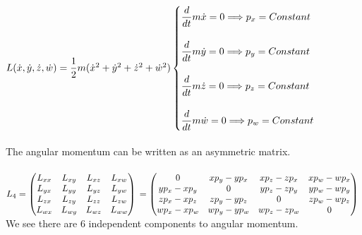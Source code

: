 \documentclass[fleqn]{article}
\begin{document}
\begin{enumerate}
\begin{itemize}
        \textcolor{hwColor}{
          $
          L(\dot{x}, \dot{y}, \dot{z}, \dot{w})=\dfrac{1}{2}m (\dot{x}^2+\dot{y}^2+\dot{z}^2+\dot{w}^2)
          \\
          \\
          \begin{cases}
            \dfrac{d}{dt}m \dot{x}=0 \Longrightarrow p_x=Constant
            \\
            \\
            \dfrac{d}{dt}m \dot{y}=0 \Longrightarrow p_y=Constant
            \\
            \\
            \dfrac{d}{dt}m \dot{z}=0 \Longrightarrow p_z=Constant
            \\
            \\
            \dfrac{d}{dt}m \dot{w}=0 \Longrightarrow p_w=Constant
          \end{cases}
          $
          \\
          \\
          The angular momentum can be written as an asymmetric matrix. 
          \\
          \\
          $
            L_4=\begin{pmatrix}
              L_{xx} & L_{xy} & L_{xz} & L_{xw} 
              \\
              L_{yx} & L_{yy} & L_{yz} & L_{yw}
              \\
              L_{zx} & L_{zy} & L_{zz} & L_{zw}
              \\
              L_{wx} & L_{wy} & L_{wz} & L_{ww}
            \end{pmatrix}
            \\
            \\
            \\
            \\
            =\begin{pmatrix}
              0 & xp_y-yp_x & xp_z-zp_x &  xp_w-wp_x
              \\
              yp_x-xp_y & 0 & yp_z-zp_y & yp_w-wp_y 
              \\
              zp_x-xp_z & zp_y-yp_z & 0 & zp_w-wp_z
              \\
              wp_x-xp_w & wp_y-yp_w & wp_z-zp_w & 0
            \end{pmatrix}
            \\
            \\
            \\
          $
          We see there are 6 independent components to angular momentum.
        }
  

\end{itemize}
\end{enumerate}
\end{document}
